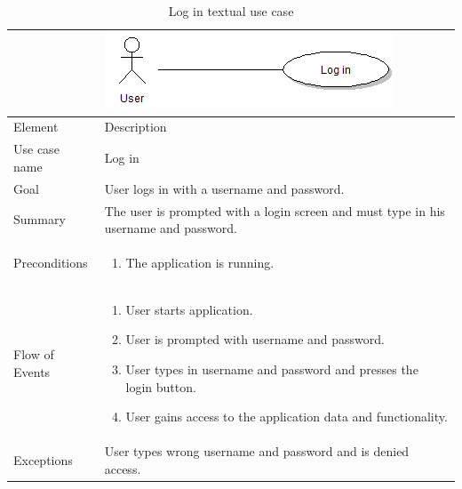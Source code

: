 \begin{table}
\begin{tabular}{p{3cm}p{12cm}}
& \includegraphics{login}\\ \hline
Element & Description \\ \hline
Use case name & Log in \\
Goal & User logs in with a username and password. \\
Summary &The user is prompted with a login screen and must type in his username and password. \\
Preconditions &
\begin{enumerate}
\item{}The application is running.
\end{enumerate} \\ \hline
Flow of Events &
\begin{enumerate}
\item{}User starts application.
\item{}User is prompted with username and password.
\item{}User types in username and password and presses the login button.
\item{}User gains access to the application data and functionality.
\end{enumerate} \\ \hline
Exceptions & User types wrong username and password and is denied access.
\end{tabular}
\caption{Log in textual use case} \label{tab:login}
\end{table}

